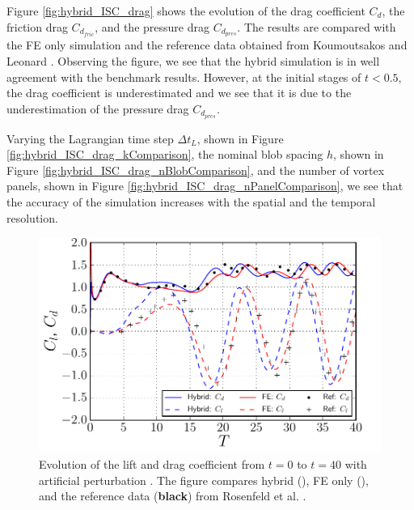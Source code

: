 Figure \ref{fig:hybrid_ISC_drag} shows the evolution of the drag coefficient $C_d$, the friction drag $C_{d_{fric}}$, and the pressure drag $C_{d_{pres}}$. The results are compared with the FE only simulation and the reference data obtained from Koumoutsakos and Leonard \cite{Koumoutsakos1995a}. Observing the figure, we see that the hybrid simulation is in well agreement with the benchmark results. However, at the initial stages of $t<0.5$, the drag coefficient is underestimated and we see that it is due to the underestimation of the pressure drag $C_{d_{pres}}$.

Varying the Lagrangian time step $\Delta t_L$, shown in Figure \ref{fig:hybrid_ISC_drag_kComparison}, the nominal blob spacing $h$, shown in Figure \ref{fig:hybrid_ISC_drag_nBlobComparison}, and the number of vortex panels, shown in Figure \ref{fig:hybrid_ISC_drag_nPanelComparison}, we see that the accuracy of the simulation increases with the spatial and the temporal resolution. 


	\begin{figure}[!b]
	\centering
	\includegraphics[width=0.6\linewidth]{./figures/validation/isc/hybrid_cylinder_LongRun_liftDrag_fixed.pdf}
	\caption{Evolution of the lift and drag coefficient from $t=0$ to $t=40$ with artificial perturbation \cite{Lecointe1984}. The figure compares hybrid ({}), FE only ({}), and the reference data (\textbf{black}) from Rosenfeld et al. \cite{MosheRosenFeldDochanKwak1991}.}
	\label{fig:hybrid_cylinder_LongRun_liftDrag}
	\end{figure}	

